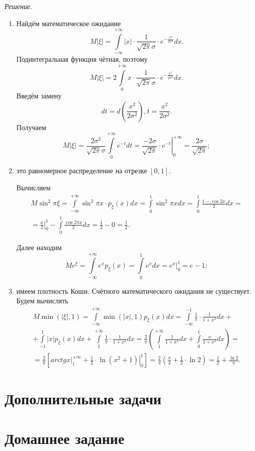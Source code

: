 \textit{Решение.}
\begin{enumerate}[label=\alph*)]
\item Найдём математическое ожидание
$$M \left| \xi \right| =
\int \limits_{- \infty }^{+ \infty } \left| x \right| \cdot \frac{1}{ \sqrt{2 \pi } \sigma } \cdot e^{- \frac{x^2}{2 \sigma^2}}dx.$$
Подинтегральная функция чётная, поэтому
$$M \left| \xi \right| =
2 \int \limits_0^{+ \infty } x \cdot \frac{1}{ \sqrt{2 \pi } \sigma } \cdot e^{- \frac{x^2}{2 \sigma^2}}dx.$$
Введём замену
$$dt = d \left( \frac{x^2}{2 \sigma^2} \right),
t = \frac{x^2}{2 \sigma^2}.$$
Получаем
$$M \left| \xi \right| =
\frac{2 \sigma^2}{ \sqrt{2 \pi } \sigma } \int \limits_0^{+ \infty } e^{-t} dt =
\left. \frac{-2 \sigma }{ \sqrt{2 \pi }} \cdot e^{-t} \right|_0^{+ \infty } =
\frac{2 \sigma }{ \sqrt{2 \pi }};$$
\item это равномерное распределение на отрезке $ \left[ 0, 1 \right] $.

Вычисляем
\begin{equation*}
\begin{split}
M \sin^2 \pi \xi =
\int \limits_{- \infty }^{+ \infty } \sin^2 \pi x \cdot p_{ \xi } \left( x \right) dx =
\int \limits_0^1 \sin^2 \pi x dx =
\int \limits_0^1 \frac{1 - \cos 2x}{2} dx = \\
= \left. \frac{x}{2} \right|_0^1 - \int \limits_0^1 \frac{ \cos 2 \pi x}{2} dx =
\frac{1}{2} - 0 =
\frac{1}{2}.
\end{split}
\end{equation*}

Далее находим
$$Me^{ \xi } =
\int \limits_{- \infty }^{+ \infty } e^x p_{ \xi } \left( x \right) =
\int \limits_0^1 e^x dx =
\left. e^x \right|_0^1 =
e - 1;$$
\item имеем плотность Коши.
Счётного математического ожидания не существует.
Будем вычислять
\begin{equation*}
\begin{split}
M \min \left( \left| \xi \right|, 1 \right) =
\int \limits_{- \infty }^{+ \infty } \min \left( \left| x \right|, 1 \right) p_{ \xi } \left( x \right) dx =
\int \limits_{- \infty }^{-1} \frac{1}{ \pi } \cdot \frac{1}{1+x^2} dx + \\
+ \int \limits_{-1}^1 \left| x \right| p_{ \xi } \left( x \right) dx +
\int \limits_1^{+ \infty } \frac{1}{ \pi } \cdot \frac{1}{1+x^2} dx =
\frac{2}{ \pi } \left( \int \limits_1^{+ \infty } \frac{1}{1+x^2} dx + \int \limits_0^1 \frac{x}{1+x^2} dx \right) = \\
= \frac{2}{ \pi } \left[ \left. arctg x \right|_1^{+ \infty } + \left. \frac{1}{2} \cdot \ln \left( x^2 + 1 \right) \right|_0^1 \right] =
\frac{2}{ \pi } \left( \frac{ \pi }{4} + \frac{1}{2} \cdot \ln 2 \right) =
\frac{1}{2} + \frac{ \ln 2}{ \pi }.
\end{split}
\end{equation*}
\end{enumerate}

\section*{Дополнительные задачи}

\section*{Домашнее задание}
